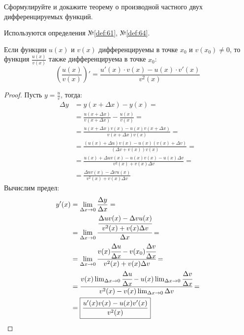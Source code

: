 \begin{question}
    Сформулируйте и докажите теорему о производной частного двух дифференцируемых функций.
\end{question}
\begin{used}
    Используются определения №\ref{def:61}, №\ref{def:64}.
\end{used}
\begin{theorem}
    Если функции $u(x)$ и $v(x)$ дифференцируемы в точке $x_0$ и $v(x_0) \neq 0$, то функция $\frac{u(x)}{v(x)}$ также дифференцируема в точке $x_0$: \[
        \left(\frac{u(x)}{v(x)}\right)' = \frac{u'(x) \cdot v(x) - u(x) \cdot v'(x)}{v^2(x)}
    \]
\end{theorem}
\begin{proof}
    Пусть $y = \frac{u}{v}$, тогда:
    \begin{align*}
        \Delta y &= y(x + \Delta x) - y(x) = \\
                 &= \frac{u(x + \Delta x)}{v(x + \Delta x)} - \frac{u(x)}{v(x)} = \\
                 &= \frac{u(x + \Delta x)v(x) - u(x)v(x + \Delta x)}{v(x + \Delta x)v(x)} = \\
                 &= \frac{(u(x) + \Delta u)v(x) - u(x)(v(x) + \Delta v)}{(\Delta v + v(x))v(x)} = \\
                 &= \frac{u(x) + \Delta u v(x) - u(x)v(x) - u(x)\Delta v}{v^2(x) + v(x) \Delta v} = \\
                 &= \frac{\Delta u v(x) - \Delta v u(x)}{v^2(x) + v(x) \Delta v}
    \end{align*}
    Вычислим предел:
    \begin{align*}
        y'(x) &= \lim_{\Delta x \to 0} \frac{\Delta y}{\Delta x} = \\
              &= \lim_{\Delta x \to 0} \cfrac{\cfrac{\Delta u v(x) - \Delta v u(x)}{v^2(x) + v(x) \Delta v}}{\Delta x} = \\
              &= \lim_{\Delta x \to 0} \cfrac{v(x) \cfrac{\Delta u}{\Delta x} - v(x_0) \cfrac{\Delta v}{\Delta x}}{v^2(x) + v(x) \Delta v} = \\
              &= \cfrac{v(x) \lim_{\Delta x \to 0} \cfrac{\Delta u}{\Delta x} - u(x) \lim_{\Delta x \to 0}  \cfrac{\Delta v}{\Delta x}}{v^2(x) - v(x) \lim_{\Delta x \to 0} \Delta v} = \\
              &= \boxed{\frac{u'(x) v(x) - u(x) v'(x)}{v^2(x)}}
    \end{align*}
\end{proof}
\pagebreak



